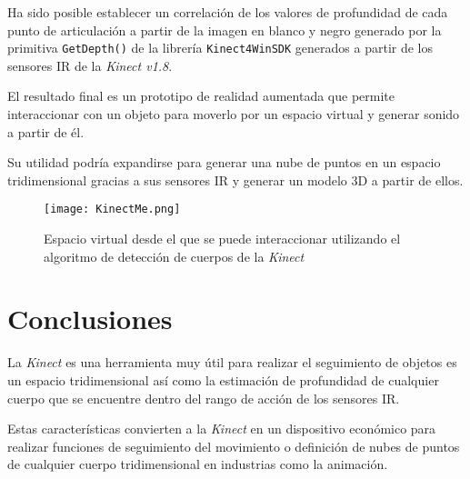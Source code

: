 \documentclass[10pt,a4paper]{report}
\begin{document}
	Ha sido posible establecer un correlación de los valores de profundidad de cada punto de articulación a partir de la imagen en blanco y negro generado por la primitiva \texttt{GetDepth()} de la librería \texttt{Kinect4WinSDK} generados a partir de los sensores IR de la \textit{Kinect v1.8}.
	
	El resultado final es un prototipo de realidad aumentada que permite interaccionar con un objeto para moverlo por un espacio virtual y generar sonido a partir de él. 
	
	Su utilidad podría expandirse para generar una nube de puntos en un espacio tridimensional gracias a sus sensores IR y generar un modelo 3D a partir de ellos.
		
	\begin{figure}[h]
		\centering
		\texttt{[image: KinectMe.png]}
		\caption{Espacio virtual desde el que se puede interaccionar utilizando el algoritmo de detección de cuerpos de la \textit{Kinect}}
	\end{figure}
	
	\chapter{Conclusiones}	
	La \textit{Kinect} es una herramienta muy útil para realizar el seguimiento de objetos es un espacio tridimensional así como la estimación de profundidad de cualquier cuerpo que se encuentre dentro del rango de acción de los sensores IR.
	
	Estas características convierten a la \textit{Kinect} en un dispositivo económico para realizar funciones de seguimiento del movimiento o definición de nubes de puntos de cualquier cuerpo tridimensional en industrias como la animación.
	
	
\end{document}
